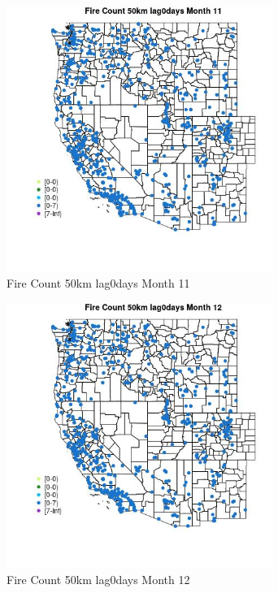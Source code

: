 \begin{figure} 
\centering  
\includegraphics[width=0.77\textwidth]{Code_Outputs/Report_ML_input_PM25_Step4_part_e_de_duplicated_aves_compiled_2019-05-21wNAs_MapObsMo11Fire_Count_50km_lag0days.jpg} 
\caption{\label{fig:Report_ML_input_PM25_Step4_part_e_de_duplicated_aves_compiled_2019-05-21wNAsMapObsMo11Fire_Count_50km_lag0days}Fire Count 50km lag0days Month 11} 
\end{figure} 
 

\begin{figure} 
\centering  
\includegraphics[width=0.77\textwidth]{Code_Outputs/Report_ML_input_PM25_Step4_part_e_de_duplicated_aves_compiled_2019-05-21wNAs_MapObsMo12Fire_Count_50km_lag0days.jpg} 
\caption{\label{fig:Report_ML_input_PM25_Step4_part_e_de_duplicated_aves_compiled_2019-05-21wNAsMapObsMo12Fire_Count_50km_lag0days}Fire Count 50km lag0days Month 12} 
\end{figure} 
 

